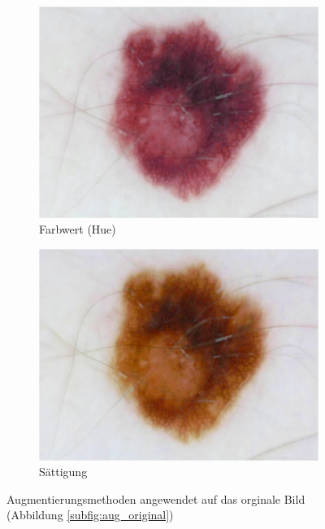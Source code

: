 \begin{figure}[t]
\begin{subfigure}[t]{0.24\linewidth}
		\includegraphics[width=\textwidth]{./pics/augmentations/hue.png}
		\caption{Farbwert (Hue)}
		\label{subfig:aug_hue}
	\end{subfigure}
	\begin{subfigure}[t]{0.24\linewidth}
		\includegraphics[width=\textwidth]{./pics/augmentations/saturation.png}
		\caption{Sättigung}
		\label{subfig:aug_sat}
	\end{subfigure}
	\caption{Augmentierungsmethoden angewendet auf das orginale Bild (Abbildung \ref{subfig:aug_original})}
\end{figure}


